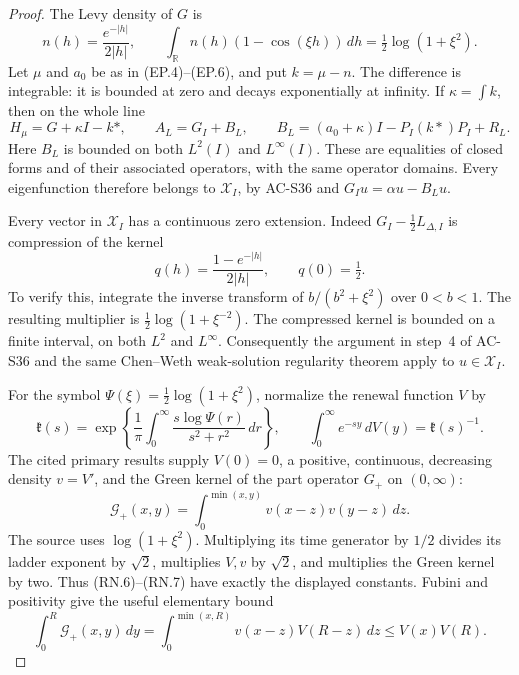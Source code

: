 \begin{proof}
The Levy density of \(G\) is
\[
 n(h)=\frac{e^{-|h|}}{2|h|},\qquad
 \int_{\mathbb R}n(h)(1-\cos(\xi h))\,dh
                      =\tfrac12\log(1+\xi^2).
                                                        \tag{RN.3}
\]
Let \(\mu\) and \(a_0\) be as in (EP.4)--(EP.6), and put
\(k=\mu-n\).  The difference is integrable: it is bounded at zero
and decays exponentially at infinity.  If \(\kappa=\int k\),
then on the whole line
\[
 H_\mu=G+\kappa I-k*,\qquad
 A_L=G_I+B_L,\qquad
 B_L=(a_0+\kappa)I-P_I(k*)P_I+R_L.
                                                        \tag{RN.4}
\]
Here \(B_L\) is bounded on both \(L^2(I)\) and \(L^\infty(I)\).
These are equalities of closed forms and of their associated
operators, with the same operator domains.  Every eigenfunction
therefore belongs to \(\mathcal X_I\), by AC-S36 and
\(G_Iu=\alpha u-B_Lu\).

Every vector in \(\mathcal X_I\) has a continuous zero extension.
Indeed \(G_I-\tfrac12L_{\Delta,I}\) is compression of the kernel
\[
                   q(h)=\frac{1-e^{-|h|}}{2|h|},\qquad q(0)=\tfrac12.
                                                        \tag{RN.5}
\]
To verify this, integrate the inverse transform of
\(b/(b^2+\xi^2)\) over \(0<b<1\).
The resulting multiplier is \(\tfrac12\log(1+\xi^{-2})\).
The compressed kernel is bounded on a finite interval, on both
\(L^2\) and \(L^\infty\).  Consequently the argument in step~4
of AC-S36 and the same Chen--Weth weak-solution regularity theorem
apply to \(u\in\mathcal X_I\).

For the symbol \(\Psi(\xi)=\tfrac12\log(1+\xi^2)\), normalize the
renewal function \(V\) by
\[
 \mathfrak k(s)=\exp\left\{\frac1\pi\int_0^\infty
                    \frac{s\log\Psi(r)}{s^2+r^2}\,dr\right\},
 \qquad
 \int_0^\infty e^{-sy}\,dV(y)=\mathfrak k(s)^{-1}.
                                                        \tag{RN.6}
\]
The cited primary results supply \(V(0)=0\), a positive, continuous,
decreasing density \(v=V'\), and the Green kernel of the part
operator \(G_+\) on \((0,\infty)\):
\[
 \mathcal G_+(x,y)
       =\int_0^{\min(x,y)}v(x-z)v(y-z)\,dz.
                                                        \tag{RN.7}
\]
The source uses \(\log(1+\xi^2)\).  Multiplying its time generator
by \(1/2\) divides its ladder exponent by \(\sqrt2\), multiplies
\(V,v\) by \(\sqrt2\), and multiplies the Green kernel by two.
Thus (RN.6)--(RN.7) have exactly the displayed constants.
Fubini and positivity give the useful elementary bound
\[
 \int_0^R\mathcal G_+(x,y)\,dy
  =\int_0^{\min(x,R)}v(x-z)V(R-z)\,dz
  \leq V(x)V(R).
                                                        \tag{RN.8}
\]


\end{proof}
